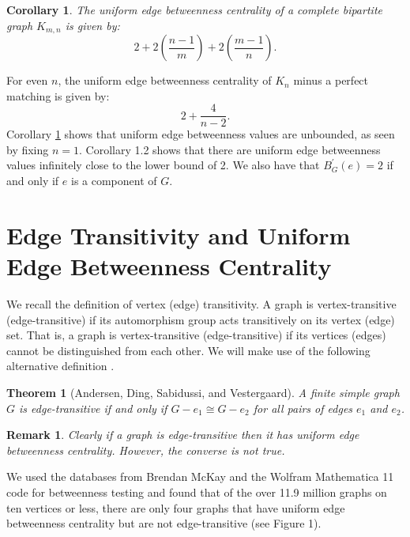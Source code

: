\documentclass{article}%
\newtheorem{theorem}{Theorem}[section]
\newtheorem{corollary}{Corollary}[section]
\newtheorem{remark}{Remark}[section]
\begin{document}
\begin{corollary}
\label{11}The uniform edge betweenness centrality of a complete bipartite
graph $K_{m,n}$ is given by:
\[
2+2\left(  \frac{n-1}{m}\right)  +2\left(  \frac{m-1}{n}\right)  .
\]

\end{corollary}

\noindent For even $n$, the uniform edge betweenness centrality of $K_{n}$
minus a perfect matching is given by:
\[
2+\frac{4}{n-2}.
\]
\newline Corollary \ref{11} shows that uniform edge betweenness values are
unbounded, as seen by fixing $n=1$. Corollary 1.2 shows that there are uniform
edge betweenness values infinitely close to the lower bound of 2. We also have
that $B_{G}^{\prime}(e)=2$ if and only if $e$ is a component of $G$.

\section{Edge Transitivity and Uniform Edge Betweenness Centrality}

We recall the definition of vertex (edge) transitivity. A graph is
vertex-transitive (edge-transitive) if its automorphism group acts
transitively on its vertex (edge) set. That is, a graph is vertex-transitive
(edge-transitive) if its vertices (edges) cannot be distinguished from each
other. We will make use of the following alternative definition
\cite{Andersen}.

\begin{theorem}
[Andersen, Ding, Sabidussi, and Vestergaard]A finite simple graph $G$ is
edge-transitive if and only if $G-e_{1}\cong G-e_{2}$ for all pairs of edges
$e_{1}$ and $e_{2}$.
\end{theorem}

\begin{remark}
Clearly if a graph is edge-transitive then it has uniform edge betweenness
centrality. However, the converse is not true.
\end{remark}

We used the databases from Brendan McKay \cite{McKay} and the Wolfram
Mathematica 11 code for betweenness testing and found that of the over 11.9
million graphs on ten vertices or less, there are only four graphs that have
uniform edge betweenness centrality but are not edge-transitive (see Figure 1).%
\end{document}
